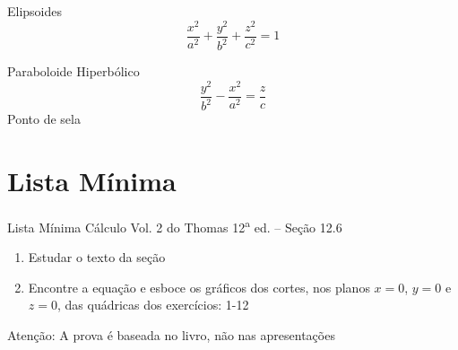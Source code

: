 \begin{frame}{Elipsoides}
  \[
    \frac{x^2}{a^2} +
    \frac{y^2}{b^2} +
    \frac{z^2}{c^2} = 1
  \]
\end{frame}

\begin{frame}{Paraboloide Hiperbólico}
  \[
    \frac{y^2}{b^2} -
    \frac{x^2}{a^2} =
    \frac{z}{c}
  \]
  Ponto de sela
\end{frame}


\section{Lista Mínima}

\begin{frame}{Lista Mínima}
  Cálculo Vol. 2 do Thomas 12\textsuperscript{a} ed. -- Seção 12.6
  \begin{enumerate}
    \item Estudar o texto da seção
    \item Encontre a equação e esboce os gráficos dos cortes,
          nos planos $x=0$, $y=0$ e $z=0$, das quádricas dos exercícios: 1-12
  \end{enumerate}

  \vfill
  Atenção: A prova é baseada no livro, não nas apresentações
\end{frame}



